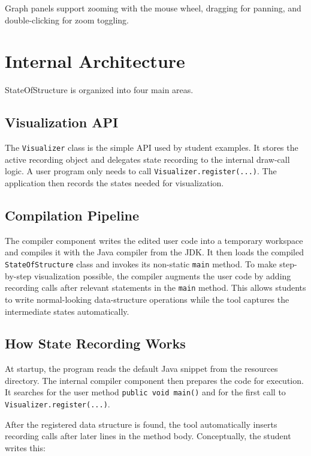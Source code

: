 \documentclass[12pt,a4paper]{article}
\begin{document}
Graph panels support zooming with the mouse wheel, dragging for panning, and double-clicking for zoom toggling.

\section{Internal Architecture}

StateOfStructure is organized into four main areas.

\subsection{Visualization API}

The \texttt{Visualizer} class is the simple API used by student examples. It stores the active recording object and delegates state recording to the internal draw-call logic. A user program only needs to call \texttt{Visualizer.register(...)}. The application then records the states needed for visualization.

\subsection{Compilation Pipeline}

The compiler component writes the edited user code into a temporary workspace and compiles it with the Java compiler from the JDK. It then loads the compiled \texttt{StateOfStructure} class and invokes its non-static \texttt{main} method.
To make step-by-step visualization possible, the compiler augments the user code by adding recording calls after relevant statements in the \texttt{main} method. This allows students to write normal-looking data-structure operations while the tool captures the intermediate states automatically.

\subsection{How State Recording Works}

At startup, the program reads the default Java snippet from the resources directory. The internal compiler component then prepares the code for execution. It searches for the user method \texttt{public void main()} and for the first call to \texttt{Visualizer.register(...)}. 


After the registered data structure is found, the tool automatically inserts recording calls after later lines in the method body. Conceptually, the student writes this:
\end{document}
